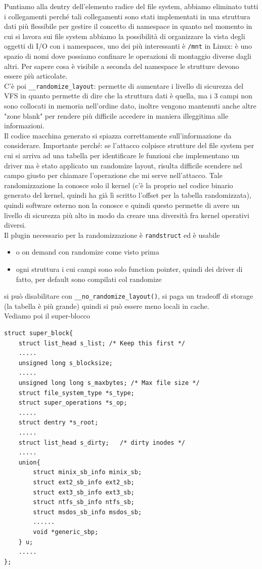 \documentclass[12pt, oneside]{extbook}
\begin{document}
Puntiamo alla dentry dell'elemento radice del file system, abbiamo eliminato tutti i collegamenti perché tali collegamenti sono stati implementati in una struttura dati più flessibile per gestire il concetto di namespace in quanto nel momento in cui si lavora sui file system abbiamo la possibilità di organizzare la vista degli oggetti di I/O con i namespaces, uno dei più interessanti è \texttt{/mnt} in Linux: è uno spazio di nomi dove possiamo confinare le operazioni di montaggio diverse dagli altri. Per sapere cosa è visibile a seconda del namespace le strutture devono essere più articolate.\\ C'è poi \texttt{\_\_randomize\_layout}: permette di aumentare i livello di sicurezza del VFS in quanto permette di dire che la struttura dati è quella, ma i 3 campi non sono collocati in memoria nell'ordine dato, inoltre vengono mantenuti anche altre "zone blank" per rendere più difficile accedere in maniera illeggitima alle informazioni.\\Il codice macchina generato si spiazza correttamente sull'informazione da considerare. Importante perché: se l'attacco colpisce strutture del file system per cui si arriva ad una tabella per identificare le funzioni che implementano un driver ma è stato applicato un randomize layout, risulta difficile scendere nel campo giusto per chiamare l'operazione che mi serve nell'attacco. Tale randomizzazione la conosce solo il kernel (c'è la proprio nel codice binario generato del kernel, quindi ha già lì scritto l'offset per la tabella randomizzata), quindi software esterno non la conosce e quindi questo permette di avere un livello di sicurezza più alto in modo da creare una diversità fra kernel operativi diversi.\\Il plugin necessario per la randomizzazione è \texttt{randstruct} ed è usabile 
\begin{itemize}
\item o on demand con randomize come visto prima
\item ogni struttura i cui campi sono solo function pointer, quindi dei driver di fatto, per default sono compilati col randomize
\end{itemize}
si può disabilitare con \texttt{\_\_no\_randomize\_layout()}, si paga un tradeoff di storage (la tabella è più grande) quindi si può essere meno locali in cache.\\Vediamo poi il super-blocco
\begin{lstlisting}
struct super_block{
	struct list_head s_list; /* Keep this first */
	.....
	unsigned long s_blocksize;
	.....
	unsigned long long s_maxbytes; /* Max file size */
	struct file_system_type *s_type;
	struct super_operations *s_op;
	.....
	struct dentry *s_root;
	.....
	struct list_head s_dirty;	/* dirty inodes */
	.....
	union{
		struct minix_sb_info minix_sb;
		struct ext2_sb_info ext2_sb;
		struct ext3_sb_info ext3_sb;
		struct ntfs_sb_info ntfs_sb;
		struct msdos_sb_info msdos_sb;
		......
		void *generic_sbp;
	} u;
	.....
};
\end{lstlisting}
\end{document}
